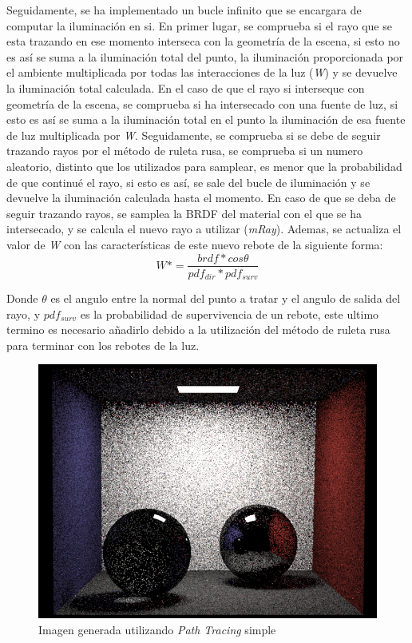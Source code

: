 \documentclass[10pt,oneside,a4paper]{article}
\begin{document}
Seguidamente, se ha implementado un bucle infinito que se encargara de computar la iluminación en si. En primer lugar, se comprueba si el rayo que se esta trazando en ese momento interseca con la geometría de la escena, si esto no es así se suma a la iluminación total del punto, la iluminación proporcionada por el ambiente multiplicada por todas las interacciones de la luz (\textit{W}) y se devuelve la iluminación total calculada. En el caso de que el rayo si interseque con geometría de la escena, se comprueba si ha intersecado con una fuente de luz, si esto es así se suma a la iluminación total en el punto la iluminación de esa fuente de luz multiplicada por \textit{W}. Seguidamente, se comprueba si se debe de seguir trazando rayos por el método de ruleta rusa, se comprueba si un numero aleatorio, distinto que los utilizados para samplear, es menor que la probabilidad de que continué el rayo, si esto es así, se sale del bucle de iluminación y se devuelve la iluminación calculada hasta el momento. En caso de que se deba de seguir trazando rayos, se samplea la BRDF del  material con el que se ha intersecado, y se calcula el nuevo rayo a utilizar (\textit{mRay}). Ademas, se actualiza el valor de \textit{W} con las características de este nuevo rebote de la siguiente forma:
$$W *= \frac{brdf * cos\theta}{pdf_{dir} * pdf_{surv}}$$

Donde $\theta$ es el angulo entre la normal del punto a tratar y el angulo de salida del rayo, y $pdf_{surv}$ es la probabilidad de supervivencia de un rebote, este ultimo termino es necesario añadirlo debido a la utilización del método de ruleta rusa para terminar con los rebotes de la luz.

\begin{figure}[h]
\centering
\includegraphics[width=.6\linewidth]{images/cbox_path_512.png}
\caption{Imagen generada utilizando \textit{Path Tracing} simple}
\label{fig:disp}
\end{figure}
\end{document}
